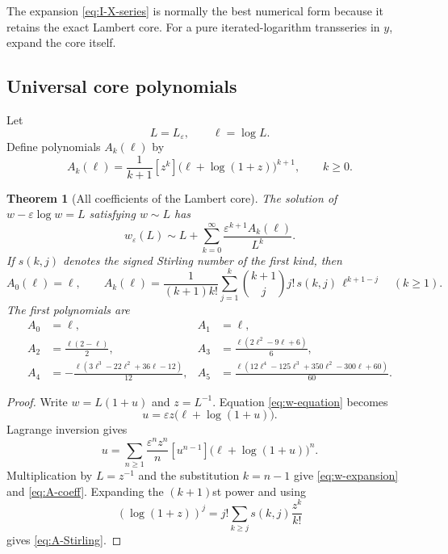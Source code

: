 \documentclass[11pt]{article}
\newtheorem{theorem}{Theorem}[section]
\theoremstyle{definition}
\theoremstyle{remark}
\newcommand{\eps}{\varepsilon}
\begin{document}
The expansion \eqref{eq:I-X-series} is normally the best numerical form because it retains the exact Lambert core.  For a pure iterated-logarithm transseries in $y$, expand the core itself.

\subsection{Universal core polynomials}

Let
\begin{equation}\label{eq:ell-def}
 L=L_\eps,
 \qquad \ell=\log L.
\end{equation}
Define polynomials $A_k(\ell)$ by
\begin{equation}\label{eq:A-coeff}
 A_k(\ell)=\frac1{k+1}[z^k]\bigl(\ell+\log(1+z)\bigr)^{k+1},
 \qquad k\ge0.
\end{equation}

\begin{theorem}[All coefficients of the Lambert core]\label{thm:Apolys}
The solution of $w-\eps\log w=L$ satisfying $w\sim L$ has
\begin{equation}\label{eq:w-expansion}
 w_\eps(L)\sim L+\sum_{k=0}^\infty
 \frac{\eps^{k+1}A_k(\ell)}{L^k}.
\end{equation}
If $s(k,j)$ denotes the signed Stirling number of the first kind, then
\begin{equation}\label{eq:A-Stirling}
 A_0(\ell)=\ell,
 \qquad
 A_k(\ell)=\frac1{(k+1)k!}
 \sum_{j=1}^{k}\binom{k+1}{j}j!\,s(k,j)\,
 \ell^{k+1-j}\quad(k\ge1).
\end{equation}
The first polynomials are
\begin{align}
 A_0&=\ell, & A_1&=\ell,\nonumber\\
 A_2&=\frac{\ell(2-\ell)}2,
 &A_3&=\frac{\ell(2\ell^2-9\ell+6)}6,\nonumber\\
 A_4&=-\frac{\ell(3\ell^3-22\ell^2+36\ell-12)}{12},
 &A_5&=\frac{\ell(12\ell^4-125\ell^3+350\ell^2-300\ell+60)}{60}.
\label{eq:A-first}
\end{align}
\end{theorem}

\begin{proof}
Write $w=L(1+u)$ and $z=L^{-1}$.  Equation \eqref{eq:w-equation} becomes
\[
 u=\eps z\bigl(\ell+\log(1+u)\bigr).
\]
Lagrange inversion gives
\[
 u=\sum_{n\ge1}\frac{\eps^nz^n}{n}
 [u^{n-1}]\bigl(\ell+\log(1+u)\bigr)^n.
\]
Multiplication by $L=z^{-1}$ and the substitution $k=n-1$ give \eqref{eq:w-expansion} and \eqref{eq:A-coeff}.  Expanding the $(k+1)$st power and using
\[
 (\log(1+z))^j=j!\sum_{k\ge j}s(k,j)\frac{z^k}{k!}
\]
gives \eqref{eq:A-Stirling}.
\end{proof}
\end{document}
